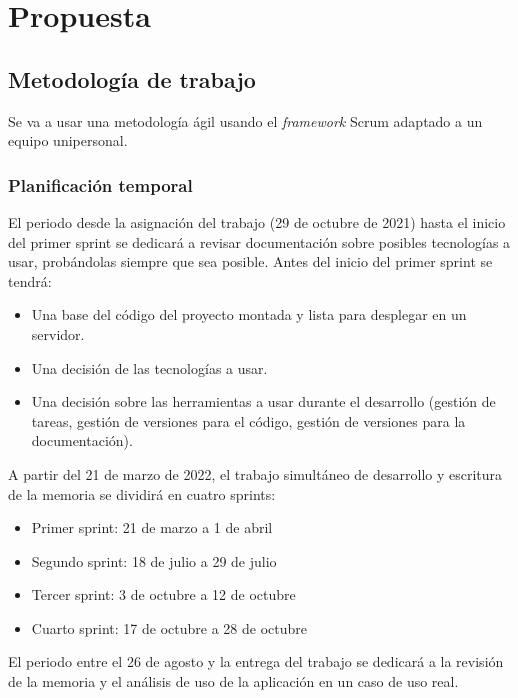 \chapter{Propuesta}


\section{Metodología de trabajo}

Se va a usar una metodología ágil usando el \textit{framework} Scrum adaptado a un equipo unipersonal.


\subsection{Planificación temporal}

El periodo desde la asignación del trabajo (29 de octubre de 2021) hasta el inicio del primer sprint se dedicará a revisar documentación sobre posibles tecnologías a usar, probándolas siempre que sea posible. Antes del inicio del primer sprint se tendrá:

\begin{itemize}
    \item Una base del código del proyecto montada y lista para desplegar en un servidor.
    \item Una decisión de las tecnologías a usar.
    \item Una decisión sobre las herramientas a usar durante el desarrollo (gestión de tareas, gestión de versiones para el código, gestión de versiones para la documentación).
\end{itemize}

A partir del 21 de marzo de 2022, el trabajo simultáneo de desarrollo y escritura de la memoria se dividirá en cuatro sprints:
\begin{itemize}
    \item Primer sprint: 21 de marzo a 1 de abril
    \item Segundo sprint: 18 de julio a 29 de julio
    \item Tercer sprint: 3 de octubre a 12 de octubre
    \item Cuarto sprint: 17 de octubre a 28 de octubre
\end{itemize}

El periodo entre el 26 de agosto y la entrega del trabajo se dedicará a la revisión de la memoria y el análisis de uso de la aplicación en un caso de uso real.


